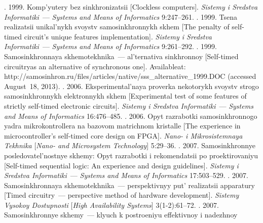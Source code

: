 \begin{multicols}{2}
{{\begin{thebibliography}{99}
. 1999. 
Komp'yutery bez sinkhronizatsii [Clockless computers]. 
\textit{Sistemy i Sredstva Informatiki}~--- \textit{Systems and Means of Informatics}
9:247--261.
. 
1999. Tsena realizatsii unikal'nykh svoystv samosinkhronnykh skhem 
[The penalty of self-timed circuit's unique features implementation]. 
\textit{Sistemy i Sredstva Informatiki}~--- \textit{Systems and Means of Informatics}
9:261--292.
. 
1999. Samosinkhronnaya skhemotekhnika~--- al'ternativa sinkhronnoy 
[Self-timed circuitry\linebreak as an alternative of synchronous one].  
Available\linebreak at:
{\sf http://samosinhron.ru/files/articles/native/sss\_\linebreak alternative\_1999.DOC} 
(accessed August~18, 2013).
. 2006. 
Ekspe\-ri\-men\-tal'\-naya proverka nekotorykh svoystv strogo samosinkhronnykh 
elektronnykh skhem [Expe\-ri\-mental test of some features of strictly self-timed electronic 
circuits]. \textit{Sistemy i Sredstva Informatiki}~--- \textit{Systems and Means of 
Informatics} 16:476--485.
. 2006. 
Opyt razrabotki samosinkhronnogo yadra mikrokontrollera na bazovom matrichnom kristalle 
[The experience in microcontroller's self-timed core design on FPGA]. 
\textit{Nano- i Mikrosistemnaya Tekhnika} [\textit{Nano- and Microsystem Technology}] 5:29--36.
. 2007. 
Samosinkhronnye posledovatel'nostnye skhemy: Opyt razrabotki i rekomendatsii 
po proektirovaniyu 
[Self-timed sequential logic: An experience and design guidelines]. 
\textit{Sistemy i Sredstva Informatiki}~--- \textit{Systems and Means of Informatics} 
17:503--529.
. 2007. Samosinkhronnaya skhemotekhnika~--- perspektivnyy 
put' realizatsii apparatury [Timed circuitry~--- perspective method of hardware development]. 
\textit{Sistemy Vysokoy Dostupnosti} [\textit{High Availability Systems}] 3(1-2):61--72.
. 
2007. Samosinkhronnye skhemy~--- klyuch k postroeniyu effektivnoy i nadezhnoy 

\end{thebibliography}}}
\end{multicols}
